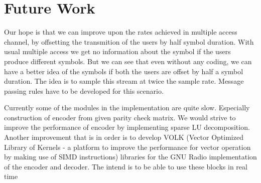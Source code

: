\section{Future Work}
Our hope is that we can improve upon the rates achieved in multiple access channel, by offsetting the transmition of the users by half symbol duration.
With usual multiple access we get no information about the symbol if the users produce different symbols. But we can see that even without any coding, we can
have a better idea of the symbols if both the users are offset by half a symbol duration. The idea is to sample this stream at twice the sample rate.
Message passing rules have to be developed for this scenario.

Currently some of the modules in the implementation are quite slow. Especially construction of encoder from given parity check matrix. We would strive to
improve the performance of encoder by implementing sparse LU decomposition. Another improvement that is in order is to develop VOLK (Vector Optimized Library of Kernels - 
a platform to improve the performance for vector operation by making use of SIMD instructions) libraries for the GNU Radio implementation of the encoder and decoder.
The intend is to be able to use these blocks in real time